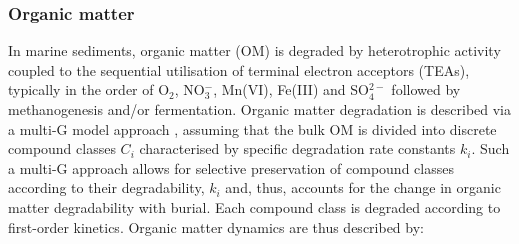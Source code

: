 \documentclass[gmd, manuscript]{copernicus}
\begin{document}
\subsubsection{Organic matter}
In marine sediments, organic matter (OM) is degraded by heterotrophic activity coupled to the sequential utilisation of terminal electron acceptors (TEAs), typically in the order of O$_2$, NO$_3^-$, Mn(VI), Fe(III) and SO$_4^{2-}$ 
followed by methanogenesis and/or fermentation. Organic matter degradation is described via a multi-G model approach \citep[][and references therein]{arndt_quantifying_2013}, assuming that the bulk OM is divided 
into discrete compound classes $C_i$ characterised by specific degradation rate constants $k_i$. Such a multi-G approach allows for selective preservation of compound classes according to their degradability, $k_i$ and, thus, accounts 
for the change in organic matter degradability with burial. Each compound class is degraded according to first-order kinetics. Organic matter dynamics are thus described by:
\end{document}

